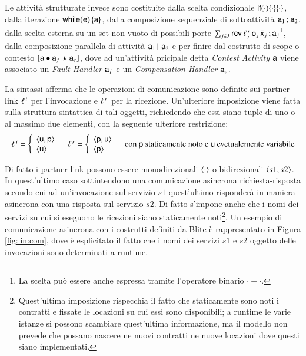 Le attività strutturate invece sono costituite dalla scelta condizionale
${\sf if}(\cdot)\{ \cdot \}\{\cdot\}$, dalla iterazione ${\sf while}({\sf e})\, \{ {\sf a}\}$, dalla
composizione sequenziale di sottoattività ${\sf a}_1\, ;{\sf a}_2$, dalla scelta
esterna su un set non vuoto di possibili porte $\sum_{j \in
J}{\sf rcv}\,\ell^{\,r}_j\, {\sf o}_j\, \bar{{\sf x}}_j\, ;{\sf a}_j$\footnote{La scelta può essere
anche espressa tramite l'operatore binario $ \cdot + \cdot$.}, dalla composizione
parallela di attività ${\sf a}_1\,|\,\, {\sf a}_2$ e per finire dal costrutto di scope o
contesto $[{\sf a} \bullet {\sf a}_f \star {\sf a}_c]$, dove ad un'attività pricipale detta
\emph{Contest Activity} ${\sf a}$ viene associato un \emph{Fault Handler} ${\sf a}_f$ e
un \emph{Compensation Handler} ${\sf a}_c$.

La sintassi afferma che le operazioni di comunicazione sono
definite sui partner link $\plinv$ per l'invocazione e $\plrec$ per la
ricezione. Un'ulteriore imposizione viene fatta sulla struttura sintattica di
tali oggetti, richiedendo che essi siano tuple di uno o al massimo due elementi,
con la seguente ulteriore restrizione:
$$
\begin{array}{ccc}

\plinv = \left\{ 
\begin{array}{l}
 \arr{\xu,\xp}   \\
 \arr{\xu}  
\end{array} \right.

&

\plrec = \left\{ 
\begin{array}{l}
 \arr{\xp,\xu}   \\
 \arr{\xp}  
\end{array} \right.

& \textrm{con } \xp \textrm{ staticamente noto e } \xu \textrm{
evetualemente variabile}

\end{array}
$$

Di fatto i partner link possono essere monodirezionali $\langle \cdot \rangle$ o
bidirezionali $\langle s1, s2 \rangle$. In quest'ultimo caso sottintendono una
comunicazione asincrona richiesta-risposta secondo cui ad un'invocazione sul
servizio $s1$ quest'ultimo risponderà in maniera asincrona con una risposta sul servizio $s2$.
Di fatto s'impone anche che i nomi dei servizi su cui si eseguono le ricezioni
siano staticamente noti\footnote{Quest'ultima imposizione rispecchia il
fatto che staticamente sono noti i contratti e fissate le
locazioni su cui essi sono disponibili; a runtime le varie istanze si possono
scambiare quest'ultima informazione, ma il modello non prevede che possano
nascere ne nuovi contratti ne nuove locazioni dove questi siano implementati.}.
Un esempio di comunicazione asincrona con i costrutti definiti da Blite è
rappresentato in Figura \ref{fig:lin:com}, dove è esplicitato il fatto che i
nomi dei servizi $s1$ e $s2$ oggetto delle invocazioni sono determinati a
runtime.

